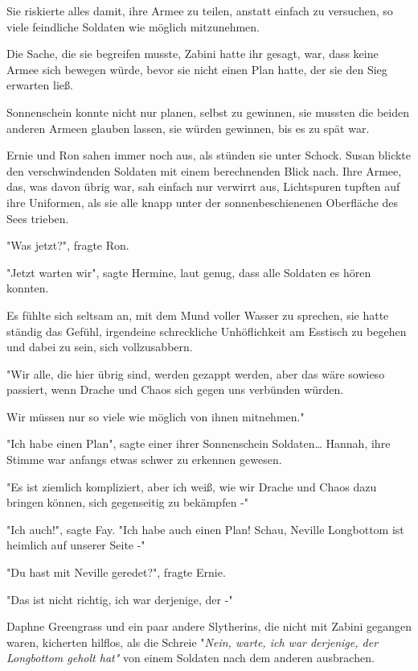 {Sie riskierte alles damit, ihre Armee zu teilen, anstatt einfach zu versuchen, so viele feindliche Soldaten wie möglich mitzunehmen.

Die Sache, die sie begreifen musste, Zabini hatte ihr gesagt, war, dass keine Armee sich bewegen würde, bevor sie nicht einen Plan hatte, der sie den Sieg erwarten ließ.

Sonnenschein konnte nicht nur planen, selbst zu gewinnen, sie mussten die beiden anderen Armeen glauben lassen, sie würden gewinnen, bis es zu spät war.

Ernie und Ron sahen immer noch aus, als stünden sie unter Schock. Susan blickte den verschwindenden Soldaten mit einem berechnenden Blick nach. Ihre Armee, das, was davon übrig war, sah einfach nur verwirrt aus, Lichtspuren tupften auf ihre Uniformen, als sie alle knapp unter der sonnenbeschienenen Oberfläche des Sees trieben.

"Was jetzt?", fragte Ron.

"Jetzt warten wir", sagte Hermine, laut genug, dass alle Soldaten es hören konnten.

Es fühlte sich seltsam an, mit dem Mund voller Wasser zu sprechen, sie hatte ständig das Gefühl, irgendeine schreckliche Unhöflichkeit am Esstisch zu begehen und dabei zu sein, sich vollzusabbern.

"Wir alle, die hier übrig sind, werden gezappt werden, aber das wäre sowieso passiert, wenn Drache und Chaos sich gegen uns verbünden würden.

Wir müssen nur so viele wie möglich von ihnen mitnehmen."

"Ich habe einen Plan", sagte einer ihrer Sonnenschein Soldaten… Hannah, ihre Stimme war anfangs etwas schwer zu erkennen gewesen.

"Es ist ziemlich kompliziert, aber ich weiß, wie wir Drache und Chaos dazu bringen können, sich gegenseitig zu bekämpfen -"

"Ich auch!", sagte Fay. "Ich habe auch einen Plan! Schau, Neville Longbottom ist heimlich auf unserer Seite -"

"Du hast mit Neville geredet?", fragte Ernie.

"Das ist nicht richtig, ich war derjenige, der -"

Daphne Greengrass und ein paar andere Slytherins, die nicht mit Zabini gegangen waren, kicherten hilflos, als die Schreie "\emph{Nein, warte, ich war derjenige, der Longbottom geholt hat"} von einem Soldaten nach dem anderen ausbrachen.

}
